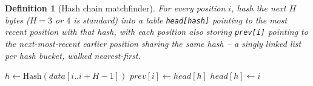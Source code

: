 \documentclass[11pt]{article}
\newtheorem{definition}{Definition}
\begin{document}
\begin{definition}[Hash chain matchfinder]
For every position $i$, hash the next $H$ bytes ($H=3$ or $4$ is standard) into a table
\texttt{head[hash]} pointing to the most recent position with that hash, with each
position also storing \texttt{prev[i]} pointing to the next-most-recent earlier position
sharing the same hash -- a singly linked list per hash bucket, walked nearest-first.
\end{definition}

\begin{algorithm}[H]
\caption{Insert position $i$ into the hash-chain structure}
\begin{algorithmic}[1]
  \State $h \gets \text{Hash}(data[i..i+H-1])$
  \State $prev[i] \gets head[h]$
  \State $head[h] \gets i$
\EndProcedure
\end{algorithmic}
\end{algorithm}
\end{document}
